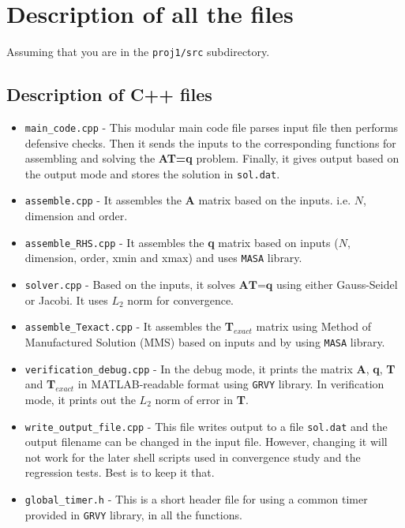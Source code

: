 \documentclass[12pt]{amsart}   %
\begin{document}
\section{Description of all the files}
Assuming that you are in the {\tt{proj1/src}} subdirectory. \\
\subsection{Description of C++ files}
\begin{itemize}
    \item {\tt{main\_code.cpp}} - This modular main code file parses input file then performs defensive checks. Then it sends the inputs to the corresponding functions for assembling and solving the \textbf{AT=q} problem. Finally, it gives output based on the output mode and stores the solution in {\tt{sol.dat}}.
    \item {\tt{assemble.cpp}} - It assembles the \textbf{A} matrix based on the inputs. i.e. $N$, dimension and order.
    \item {\tt{assemble\_RHS.cpp}} - It assembles the \textbf{q} matrix based on inputs ($N$, dimension, order, xmin and xmax) and uses {\tt{MASA}} library.
    \item {\tt{solver.cpp}} - Based on the inputs, it solves $\textbf{AT=q}$ using either Gauss-Seidel or Jacobi. It uses $L_2$ norm for convergence.
    \item {\tt{assemble\_Texact.cpp}} - It assembles the \textbf{T}$_{exact}$ matrix using Method of Manufactured Solution (MMS) based on inputs and by using {\tt{MASA}} library.
    \item {\tt{verification\_debug.cpp}} - In the debug mode, it prints the matrix \textbf{A}, \textbf{q}, \textbf{T} and \textbf{T}$_{exact}$ in MATLAB-readable format using {\tt{GRVY}} library. In verification mode, it prints out the $L_2$ norm of error in \textbf{T}.
    \item {\tt{write\_output\_file.cpp}} - This file writes output to a file {\tt{sol.dat}} and the output filename can be changed in the input file. However, changing it will not work for the later shell scripts used in convergence study and the regression tests. Best is to keep it that. 
    \item {\tt{global\_timer.h}} - This is a short header file for using a common timer provided in {\tt{GRVY}} library, in all the functions.
\end{itemize}
\end{document}
